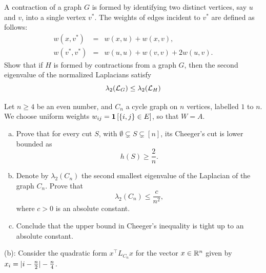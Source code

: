 \begin{myexercise}
A contraction of a graph $G$ is formed by identifying two distinct vertices, say
$u$ and $v$, into a single vertex $v^*$. The weights of edges incident to $v^*$ are defined as
follows:
\begin{eqnarray*}
w(x,v^*) &=& w(x,u) + w(x,v), \\
w(v^*,v^*) &=& w(u,u) + w(v,v) + 2w(u,v).
\end{eqnarray*}
Show that if $H$ is formed by contractions from a graph $G$, then the second eigenvalue of the normalized Laplacians satisfy
$$\lambda_2(\mathcal{L}_{G}) \leq \lambda_2(\mathcal{L}_{H})$$    
\end{myexercise}

\begin{myexercise}\label{prob:cheeger_upper_bound}
    Let $n \geq 4$ be an even number, and $C_n$ a cycle graph on $n$ vertices, labelled $1$ to $n$. We choose uniform weights $w_{ij} = \mathbf{1}\left[ \{i,j\} \in E \right]$, so that $W = A$.
    \begin{enumerate}[(a)]
        \item Prove that for every cut $S$, with $\emptyset \subsetneq S \subsetneq [n]$, its Cheeger's cut is lower bounded as
        \begin{equation*}
            h(S) \geq \frac{2}{n}.
        \end{equation*}
        
        \item Denote by $\lambda_2(C_n)$ the second smallest eigenvalue of the Laplacian of the graph $C_n$. Prove that 
        \begin{equation*}
            \lambda_2(C_n) \leq \frac{c}{n^2},
        \end{equation*}
        where $c > 0$ is an absolute constant.
        
        \item Conclude that the upper bound in Cheeger's inequality is tight up to an absolute constant.
    \end{enumerate}
\end{myexercise}
\begin{hint}    
    (b): Consider the quadratic form $x^\top L_{C_n} x$ for the vector $x \in \mathbb{R}^n$ given by $x_i = |i-\frac{n}{2}|-\frac{n}{4}$.
\end{hint}


